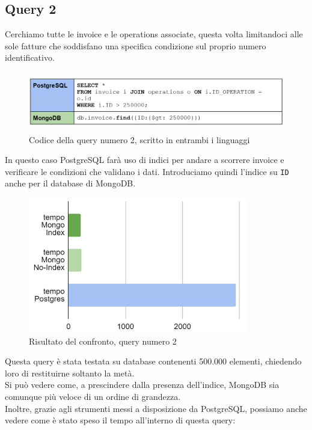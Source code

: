 \subsection{Query 2}
Cerchiamo tutte le invoice e le operations associate, questa volta limitandoci alle sole fatture che soddisfano una specifica condizione sul proprio numero identificativo.\\

\begin{figure}[htbp]
\begin{center}
\includegraphics[height=7em]{immagini/query/query2.png}
\caption{Codice della query numero 2, scritto in entrambi i linguaggi}
\end{center}
\end{figure}

\noindent In questo caso PostgreSQL farà uso di indici per andare a scorrere invoice e verificare le condizioni che validano i dati. Introduciamo quindi l'indice su \texttt{ID} anche per il database di MongoDB.\\

\begin{figure}[htbp]
\begin{center}
\includegraphics[height=16em]{immagini/query/query2_results1.png}
\caption{Risultato del confronto, query numero 2}
\end{center}
\end{figure}

\noindent Questa query è stata testata su database contenenti 500.000 elementi, chiedendo loro di restituirne soltanto la metà.\\
Si può vedere come, a prescindere dalla presenza dell'indice, MongoDB sia comunque più veloce di un ordine di grandezza.\\
Inoltre, grazie agli strumenti messi a disposizione da PostgreSQL, possiamo anche vedere come è stato speso il tempo all'interno di questa query:

